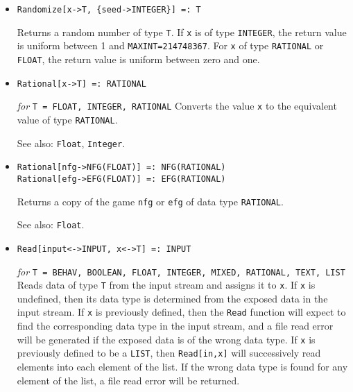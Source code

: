 \begin{itemize}
\item{}
\protect \large \begin{verbatim}
Randomize[x->T, {seed->INTEGER}] =: T
\end{verbatim}\normalsize

\bd
Returns a random number of type \verb+T+.  If \verb+x+ is of type
\verb+INTEGER+, the return value is uniform between 1 and
\verb+MAXINT=214748367+.  For \verb+x+ of type \verb+RATIONAL+ or
\verb+FLOAT+, the return value is uniform between zero and one.  
\ed

\item{}
\protect \large \begin{verbatim}
Rational[x->T] =: RATIONAL
\end{verbatim} \normalsize

{\it for} {\tt T = FLOAT, INTEGER, RATIONAL}
\bd
Converts the value \verb+x+ to the equivalent value of
type {\tt RATIONAL}.
\item [See also:] \verb+Float+, \verb+Integer+.
\ed

\item{}
\protect \large \begin{verbatim}
Rational[nfg->NFG(FLOAT)] =: NFG(RATIONAL)
Rational[efg->EFG(FLOAT)] =: EFG(RATIONAL)
\end{verbatim} \normalsize

\bd
Returns a copy of the game \verb+nfg+ or \verb+efg+ of data type 
{\tt RATIONAL}. 
\item [See also:] \verb+Float+.
\ed

\item{}
\protect \large \begin{verbatim}
Read[input<->INPUT, x<->T] =: INPUT 
\end{verbatim}\normalsize

{\it for} {\tt T = BEHAV, BOOLEAN, FLOAT, INTEGER, MIXED, RATIONAL,
TEXT, LIST}
\bd
Reads data of type \verb+T+ from the input stream and assigns it to
\verb+x+.  If \verb+x+ is undefined, then its data type is determined
from the exposed data in the input stream.  If \verb+x+ is previously
defined, then the \verb+Read+ function will expect to find the
corresponding data type in the input stream, and a file read error
will be generated if the exposed data is of the wrong data type.  If
\verb+x+ is previously defined to be a \verb+LIST+, then \verb+Read[in,x]+
will successively read elements into each element of the list.  If the
wrong data type is found for any element of the list, a file read
error will be returned.


\end{itemize}
